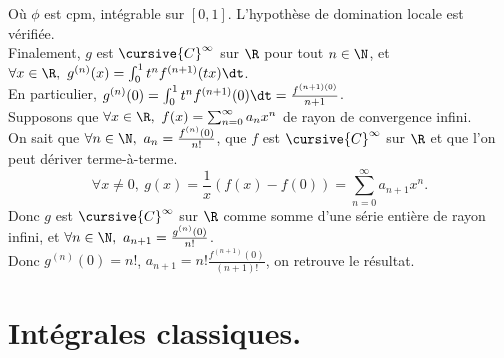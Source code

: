 \documentclass[11pt]{article}
\begin{document}
\begin{ex}{}{}
    Où $\phi$ est cpm, intégrable sur $[0,1]$. L'hypothèse de domination locale est vérifiée.\\
    Finalement, $g$ est $\cursive{C}^{\infty}$ sur $\R$ pour tout $n\in\N$, et $\forall x \in \R, ~ g^{(n)}(x)=\int_0^1 t^nf^{(n+1)}(tx)\dt$.\\
    En particulier, $g^{(n)}(0)=\int_0^1 t^n f^{(n+1)}(0)\dt = \frac{f^{(n+1)(0)}}{n+1}$.\\
     Supposons que $\forall x \in \R, ~ f(x)=\sum_{n=0}^{\infty}a_nx^n$ de rayon de convergence infini.\\
    On sait que $\forall n \in \N, ~ a_n = \frac{f^{(n)}(0)}{n!}$, que $f$ est $\cursive{C}^{\infty}$ sur $\R$ et que l'on peut dériver terme-à-terme.
    \begin{equation*}
        \forall x \neq 0, ~ g(x) = \frac{1}{x}(f(x)-f(0)) = \sum_{n=0}^{\infty} a_{n+1}x^n.
    \end{equation*}
    Donc $g$ est $\cursive{C}^\infty$ sur $\R$ comme somme d'une série entière de rayon infini, et $\forall n \in \N, ~ a_{n+1}=\frac{g^{(n)}(0)}{n!}$.\\
    Donc $g^{(n)}(0)=n!$, $a_{n+1}=n!\frac{f^{(n+1)}(0)}{(n+1)!}$, on retrouve le résultat.
\end{ex}

\pagebreak

\section{Intégrales classiques.}
\end{document}
